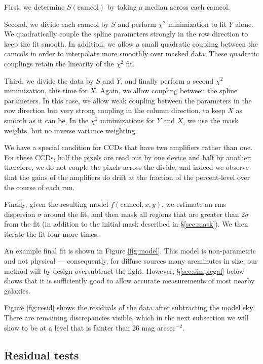\documentclass[10pt,preprint]{aastex}
\begin{document}
First, we determine $S(\mathrm{camcol})$ by taking a median across
each camcol.

Second, we divide each camcol by $S$ and perform $\chi^2$ minimization
to fit $Y$ alone. We quadratically couple the spline parameters
strongly in the row direction to keep the fit smooth. In addition, we
allow a small quadratic coupling between the camcols in order to
interpolate more smoothly over masked data. These quadratic couplings
retain the linearity of the $\chi^2$ fit.

Third, we divide the data by $S$ and $Y$, and finally perform a second
$\chi^2$ minimization, this time for $X$. Again, we allow coupling
between the spline parameters.  In this case, we allow weak coupling
between the parameters in the row direction but very strong coupling
in the column direction, to keep $X$ as smooth as it can be. In the
$\chi^2$ minimizations for $Y$ and $X$, we use the mask weights, but
no inverse variance weighting.

We have a special condition for CCDs that have two amplifiers rather
than one. For these CCDs, half the pixels are read out by one device
and half by another; therefore, we do not couple the pixels across the
divide, and indeed we observe that the gains of the amplifiers do
drift at the fraction of the percent-level over the course of each
run.

Finally, given the resulting model $f(\mathrm{camcol}, x, y)$, we
estimate an rms dispersion $\sigma$ around the fit, and then mask all
regions that are greater than 2$\sigma$ from the fit (in addition to
the initial mask described in \S\ref{sec:mask}). We then iterate the
fit four more times.

An example final fit is shown in Figure \ref{fig:model}. This model is
non-parametric and not physical --- consequently, for diffuse sources
many arcminutes in size, our method will by design oversubtract the
light.  However, \S\ref{sec:simplegal} below shows that it is
sufficiently good to allow accurate measurements of most nearby
galaxies.

Figure \ref{fig:resid} shows the residuals of the data after
subtracting the model sky.  There are remaining discrepancies visible,
which in the next subsection we will show to be at a level that is
fainter than 26 mag arcsec$^{-2}$.

\subsection{Residual tests}
\label{sec:residuals}
\end{document}
